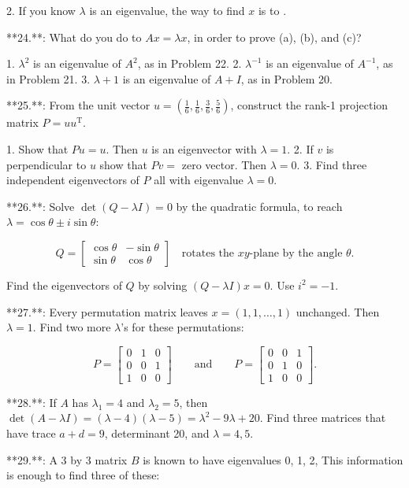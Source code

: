 2. If you know \(\lambda\) is an eigenvalue, the way to find \(x\) is to .

**24.**: What do you do to \(Ax=\lambda x\), in order to prove (a), (b), and (c)?

1. \(\lambda^{2}\) is an eigenvalue of \(A^{2}\), as in Problem 22.
2. \(\lambda^{-1}\) is an eigenvalue of \(A^{-1}\), as in Problem 21.
3. \(\lambda+1\) is an eigenvalue of \(A+I\), as in Problem 20.

**25.**: From the unit vector \(u=\left(\frac{1}{6},\frac{1}{6},\frac{3}{6},\frac{5}{6}\right)\), construct the rank-1 projection matrix \(P=uu^{\mathrm{T}}\).

1. Show that \(Pu=u\). Then \(u\) is an eigenvector with \(\lambda=1\).
2. If \(v\) is perpendicular to \(u\) show that \(Pv=\) zero vector. Then \(\lambda=0\).
3. Find three independent eigenvectors of \(P\) all with eigenvalue \(\lambda=0\).

**26.**: Solve \(\det(Q-\lambda I)=0\) by the quadratic formula, to reach \(\lambda=\cos\theta\pm i\sin\theta\):

\[Q=\begin{bmatrix}\cos\theta&-\sin\theta\\ \sin\theta&\cos\theta\end{bmatrix}\quad\text{rotates the $xy$-plane by the angle $\theta$.}\]

Find the eigenvectors of \(Q\) by solving \((Q-\lambda I)x=0\). Use \(i^{2}=-1\).

**27.**: Every permutation matrix leaves \(x=(1,1,\ldots,1)\) unchanged. Then \(\lambda=1\). Find two more \(\lambda\)'s for these permutations:

\[P=\begin{bmatrix}0&1&0\\ 0&0&1\\ 1&0&0\end{bmatrix}\qquad\text{and}\qquad P=\begin{bmatrix}0&0&1\\ 0&1&0\\ 1&0&0\end{bmatrix}.\]

**28.**: If \(A\) has \(\lambda_{1}=4\) and \(\lambda_{2}=5\), then \(\det(A-\lambda I)=(\lambda-4)(\lambda-5)=\lambda^{2}-9\lambda+20\). Find three matrices that have trace \(a+d=9\), determinant 20, and \(\lambda=4,5\).

**29.**: A 3 by 3 matrix \(B\) is known to have eigenvalues 0, 1, 2, This information is enough to find three of these:

